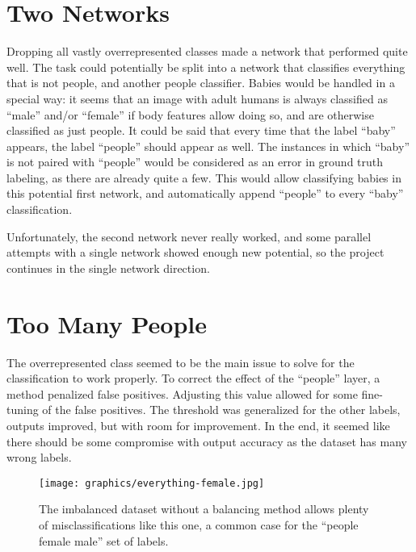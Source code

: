 \documentclass{article}
\begin{document}
\section{Two Networks}
Dropping all vastly overrepresented classes made a network that performed quite well.
The task could potentially be split into a network that classifies everything that is not people, and another people classifier.
Babies would be handled in a special way: it seems that an image with adult humans is always classified as ``male'' and/or ``female'' if body features allow doing so, and are otherwise classified as just people.
It could be said that every time that the label ``baby'' appears, the label ``people'' should appear as well.
The instances in which ``baby'' is not paired with ``people'' would be considered as an error in ground truth labeling, as there are already quite a few.
This would allow classifying babies in this potential first network, and automatically append ``people'' to every ``baby'' classification.

Unfortunately, the second network never really worked, and some parallel attempts with a single network showed enough new potential, so the project continues in the single network direction.


\section{Too Many People}
The overrepresented class seemed to be the main issue to solve for the classification to work properly.
To correct the effect of the ``people'' layer, a method penalized false positives.
Adjusting this value allowed for some fine-tuning of the false positives.
The threshold was generalized for the other labels, outputs improved, but with room for improvement.
In the end, it seemed like there should be some compromise with output accuracy as the dataset has many wrong labels.

\begin{figure}[ht]
  \centering
  \texttt{[image: graphics/everything-female.jpg]}
  \caption{The imbalanced dataset without a balancing method allows plenty of misclassifications like this one, a common case for the ``people female male'' set of labels.}
\end{figure}
\end{document}
